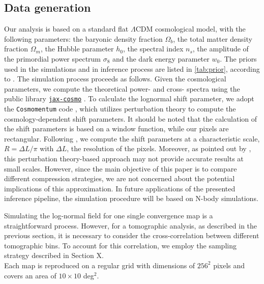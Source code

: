 \documentclass{aa}
\begin{document}
\subsection{Data generation}
Our analysis is based on a standard flat $\Lambda$CDM cosmological model, with the following parameters: the baryonic density fraction $\Omega_b$, the total matter density fraction $\Omega_m$, the Hubble parameter $h_0$, the spectral index $n_s$, the amplitude of the primordial power spectrum $\sigma_8$ and the dark energy parameter $w_0$. The priors used in the simulations and in inference process are listed in \autoref{tab:prior}, according to \citet{zhang2022transitioning}.
The simulation process proceeds as follows. Given the cosmological parameters, we compute the theoretical power- and cross- spectra using the public library \href{https://github.com/DifferentiableUniverseInitiative/jax_cosmo}{\texttt{jax-cosmo}} \citep{Campagne_2023}. To calculate the 
lognormal shift parameter, we adopt the \texttt{Cosmomentum} code \citep{friedrich2018density, friedrich2020primordial}, which utilizes perturbation theory to compute the cosmology-dependent shift parameters. It should be noted that the calculation of the shift parameters is based on a window function, while our pixels are rectangular. Following \citet{boruah2022map}, we compute the shift parameters at a characteristic scale, $R=\Delta L/\pi$  with $\Delta L$, the resolution of the pixels.  Moreover, as pointed out by \citet{boruah2022map}, this perturbation theory-based approach may not provide accurate results at small scales. However, since the main objective of this paper is to compare different compression strategies, we are not concerned about the potential implications of this approximation. In future applications of the presented inference pipeline, the simulation procedure will be based on N-body simulations.


Simulating the log-normal field for one single convergence map is a straightforward process. 
However, for a tomographic analysis, as described in the previous section, it is necessary to consider the cross-correlation between different tomographic bins. To account for this correlation, we employ the sampling strategy described in Section X. \\
Each map is reproduced on a regular grid with dimensions of $256^2$ pixels and covers an area of $10\times 10$ deg$^2$.
\end{document}
